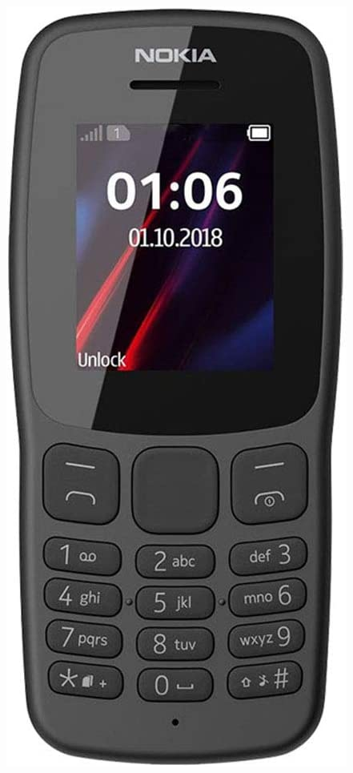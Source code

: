 \begin{frame}
\begin{columns}
\begin{center}
\includegraphics[width=0.95\linewidth]{00_IntroProgramacionYMoviles/FeaturePhone_Nokia.png} 

\end{center}
\end{columns}
\end{frame}
